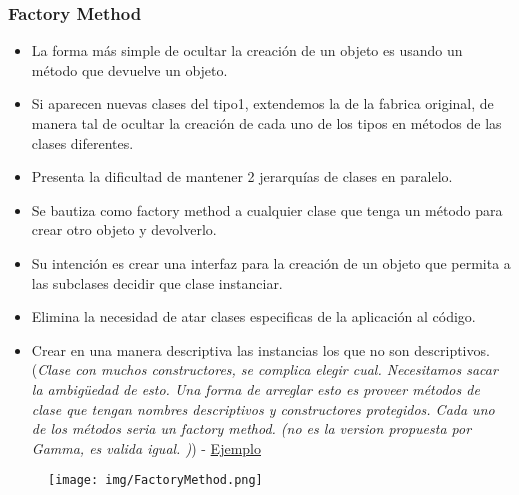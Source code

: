 \subsubsection*{Factory Method}
\begin{itemize}
\item La forma más simple de ocultar la creación de un objeto es usando un método que devuelve un objeto.
\item Si aparecen nuevas clases del tipo1, extendemos la de la fabrica original, de manera tal de ocultar la creación de cada uno de los tipos en métodos de las clases diferentes.
\item Presenta la dificultad de mantener 2 jerarquías de clases en paralelo.
\item Se bautiza como factory method a cualquier clase que tenga un método para crear otro objeto y devolverlo.
\item Su intención es crear una interfaz para la creación de un objeto que permita a las subclases decidir que clase instanciar.
\item Elimina la necesidad de atar clases especificas de la aplicación al código.
\item Crear en una manera descriptiva las instancias los que no son descriptivos. (\textit{Clase con muchos constructores, se complica elegir cual. Necesitamos sacar la ambigüedad de esto. Una forma de arreglar esto es proveer métodos de clase que tengan nombres descriptivos y constructores protegidos. Cada uno de los métodos seria un factory method. (no es la version propuesta por Gamma, es valida igual. )}) - \href{https://github.com/brunograssano/Algoritmos_3_TP2_PM2/blob/master/src/main/java/edu/fiuba/algo3/modelo/preguntas/FabricaDePreguntas.java}{Ejemplo}
\end{itemize}

\begin{figure}[!htb]
    \centering
    \texttt{[image: img/FactoryMethod.png]}
\end{figure}

